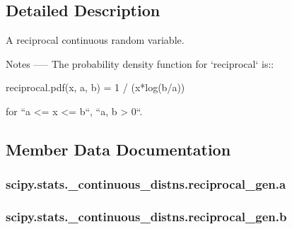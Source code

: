 \subsection{Detailed Description}
\begin{DoxyVerb}A reciprocal continuous random variable.


Notes
-----
The probability density function for `reciprocal` is::

    reciprocal.pdf(x, a, b) = 1 / (x*log(b/a))

for ``a <= x <= b``, ``a, b > 0``.

 

\subsection{Member Data Documentation}
\hypertarget{classscipy_1_1stats_1_1__continuous__distns_1_1reciprocal__gen_a447cf09887de7f40cdab0fb6d4e96691}{}
\subsubsection[{a}]{\setlength{\rightskip}{0pt plus 5cm}scipy.\+stats.\+\_\+continuous\+\_\+distns.\+reciprocal\+\_\+gen.\+a}\label{classscipy_1_1stats_1_1__continuous__distns_1_1reciprocal__gen_a447cf09887de7f40cdab0fb6d4e96691}
\hypertarget{classscipy_1_1stats_1_1__continuous__distns_1_1reciprocal__gen_abde739e6bb98fe8390e1c31a6c28105a}{}
\subsubsection[{b}]{\setlength{\rightskip}{0pt plus 5cm}scipy.\+stats.\+\_\+continuous\+\_\+distns.\+reciprocal\+\_\+gen.\+b}\label{classscipy_1_1stats_1_1__continuous__distns_1_1reciprocal__gen_abde739e6bb98fe8390e1c31a6c28105a}
\hypertarget{classscipy_1_1stats_1_1__continuous__distns_1_1reciprocal__gen_af1b922b39be7f744fcb9ce7cd81a64bd}{}

\end{DoxyVerb}

